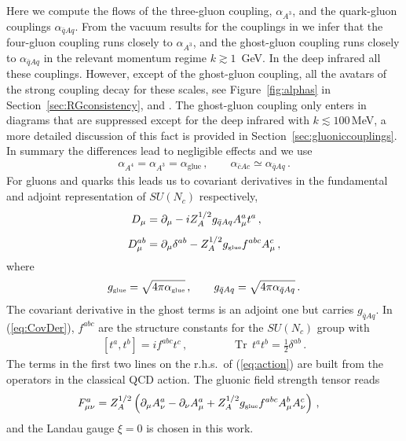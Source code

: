 \documentclass[%
reprint,
superscriptaddress,
showpacs,preprintnumbers,
 amsmath,amssymb,
 aps,
prd,
]{revtex4-1}
\newcommand{\Tr}{\ensuremath{\operatorname{Tr}}}
\def\Fig#1{Figure~\ref{#1}}
\def\eq#1{(\ref{#1})}
\def\sec#1{Section~\ref{#1}}
\begin{document}
Here we compute the flows of the three-gluon coupling, $\alpha_{A^3}$,
and the quark-gluon couplings $\alpha_{\bar q A q}$. From the vacuum
results for the couplings in \cite{Braun:2014ata, Cyrol:2017ewj} we
infer that the four-gluon coupling runs closely to $\alpha_{A^3}$, and
the ghost-gluon coupling runs closely to $\alpha_{\bar q A q}$ in the
relevant momentum regime $k\gtrsim 1$\, GeV. In the deep infrared all
these couplings. However, except of the ghost-gluon coupling,
  all the avatars of the strong coupling decay for these scales, see
  \Fig{fig:alphas} in \sec{sec:RGconsistency}, and
  \cite{Braun:2014ata, Cyrol:2017ewj}. The ghost-gluon coupling only
  enters in diagrams that are suppressed except for the deep infrared
  with $k\lesssim 100$\,MeV, a more detailed discussion of this fact
  is provided in \sec{sec:gluoniccouplings}.  In summary the differences
  lead to negligible effects and we use
%
\begin{align}\label{eq:IDalphaGlue}
  \alpha_{A^4} = \alpha_{A^3}=\alpha_{\textrm{glue}}\,,
  \qquad  \alpha_{\bar c Ac} \simeq\alpha_{
 \bar q Aq} \,.
\end{align}
%
For gluons and quarks this leads us to covariant derivatives in the
fundamental and adjoint representation of $SU(N_c)$ respectively,
%
\begin{align}\nonumber 
  D_{\mu}&=\partial_{\mu}-i Z_{A}^{1/2} g_{\bar q A q}
           A^a_{\mu} t^a\,,\\[1ex]
  D^{ab}_{\mu}&=\partial_{\mu} \delta^{ab}-Z_{A}^{1/2}
                g_{\textrm{\tiny{glue}}} f^{abc} A^c_{\mu}\,,
                \label{eq:CovDer}
\end{align}
%
where
 \begin{align}
   g_{\textrm{\tiny{glue}}} =\sqrt{4\pi{\alpha}_{\textrm{\tiny{glue}}}}\,,\qquad
   g_{\bar q  A q } =\sqrt{4\pi{\alpha}_{\bar q A q }} \,.
\end{align}
%
The covariant derivative in the ghost terms is an adjoint one but
carries $g_{\bar q A q }$.  In \eq{eq:CovDer}, $f^{abc}$ are the
structure constants for the $SU(N_c)$ group with
%
\begin{align}\label{eq:group}
  [t^a,t^b]=i f^{abc} t^c\,,\qquad \qquad 
  \Tr\, t^a t^b=\frac{1}{2}\delta^{ab}\,.
\end{align}
%
The terms in the first two lines on the r.h.s.\ of \eq{eq:action} are
built from the operators in the classical QCD action. The gluonic
field strength tensor reads
%
\begin{align}\label{eq:Fmunu}
   F^a_{\mu\nu}&=Z_{A}^{1/2}\left(\partial_{\mu}A^a_{\nu}
                 -\partial_{\nu}A^a_{\mu}+Z_{A}^{1/2}g_{\textrm{\tiny{glue}}}
                 f^{abc}A^b_{\mu}A^c_{\nu}\right)\,,
\end{align}
%
and  the Landau gauge $\xi=0$  is chosen in this work.
\end{document}
